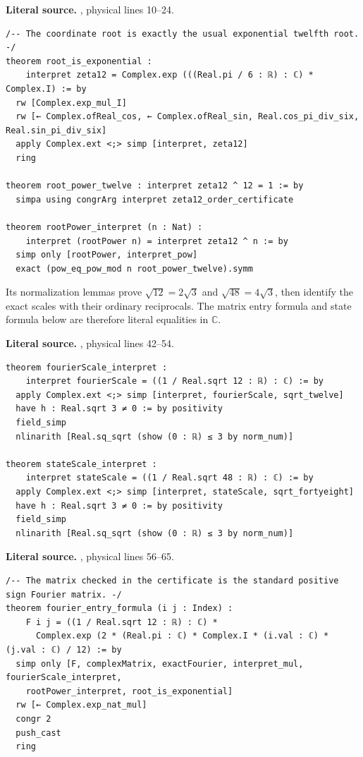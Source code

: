 \noindent\textbf{Literal source.} \texttt{}, physical lines 10--24.

\begin{Verbatim}[breaklines=true,breakanywhere=true,fontsize=\footnotesize,samepage=true]
/-- The coordinate root is exactly the usual exponential twelfth root. -/
theorem root_is_exponential :
    interpret zeta12 = Complex.exp (((Real.pi / 6 : ℝ) : ℂ) * Complex.I) := by
  rw [Complex.exp_mul_I]
  rw [← Complex.ofReal_cos, ← Complex.ofReal_sin, Real.cos_pi_div_six, Real.sin_pi_div_six]
  apply Complex.ext <;> simp [interpret, zeta12]
  ring

theorem root_power_twelve : interpret zeta12 ^ 12 = 1 := by
  simpa using congrArg interpret zeta12_order_certificate

theorem rootPower_interpret (n : Nat) :
    interpret (rootPower n) = interpret zeta12 ^ n := by
  simp only [rootPower, interpret_pow]
  exact (pow_eq_pow_mod n root_power_twelve).symm
\end{Verbatim}

Its normalization lemmas prove \(\sqrt{12}=2\sqrt3\) and
\(\sqrt{48}=4\sqrt3\), then identify the exact scales with their ordinary
reciprocals. The matrix entry formula and state formula below are therefore
literal equalities in \(\mathbb C\).

\noindent\textbf{Literal source.} \texttt{}, physical lines 42--54.

\begin{Verbatim}[breaklines=true,breakanywhere=true,fontsize=\footnotesize,samepage=true]
theorem fourierScale_interpret :
    interpret fourierScale = ((1 / Real.sqrt 12 : ℝ) : ℂ) := by
  apply Complex.ext <;> simp [interpret, fourierScale, sqrt_twelve]
  have h : Real.sqrt 3 ≠ 0 := by positivity
  field_simp
  nlinarith [Real.sq_sqrt (show (0 : ℝ) ≤ 3 by norm_num)]

theorem stateScale_interpret :
    interpret stateScale = ((1 / Real.sqrt 48 : ℝ) : ℂ) := by
  apply Complex.ext <;> simp [interpret, stateScale, sqrt_fortyeight]
  have h : Real.sqrt 3 ≠ 0 := by positivity
  field_simp
  nlinarith [Real.sq_sqrt (show (0 : ℝ) ≤ 3 by norm_num)]
\end{Verbatim}

\noindent\textbf{Literal source.} \texttt{}, physical lines 56--65.

\begin{Verbatim}[breaklines=true,breakanywhere=true,fontsize=\footnotesize,samepage=true]
/-- The matrix checked in the certificate is the standard positive sign Fourier matrix. -/
theorem fourier_entry_formula (i j : Index) :
    F i j = ((1 / Real.sqrt 12 : ℝ) : ℂ) *
      Complex.exp (2 * (Real.pi : ℂ) * Complex.I * (i.val : ℂ) * (j.val : ℂ) / 12) := by
  simp only [F, complexMatrix, exactFourier, interpret_mul, fourierScale_interpret,
    rootPower_interpret, root_is_exponential]
  rw [← Complex.exp_nat_mul]
  congr 2
  push_cast
  ring
\end{Verbatim}

